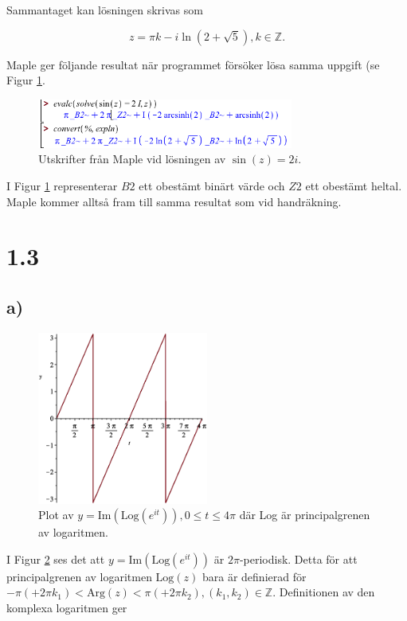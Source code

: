 \documentclass[a4paper]{article}
\begin{document}
Sammantaget kan lösningen skrivas som

\begin{equation*}
	z = \pi k - i\ln(2+\sqrt{5}), k \in \mathbb{Z}.
\end{equation*}

Maple ger följande resultat när programmet försöker lösa samma uppgift (se Figur \ref{fig:maple2}.

\begin{figure}[h!]
	\centering
	\includegraphics[width=0.75\textwidth]{maple2.png}
	\caption{Utskrifter från Maple vid lösningen av $\sin(z) = 2i$.}
	\label{fig:maple2}
\end{figure}

I Figur \ref{fig:maple2} representerar $B2$ ett obestämt binärt värde och $Z2$ ett obestämt heltal. Maple kommer alltså fram till samma resultat som vid handräkning.

\newpage
\section*{1.3}
\subsection*{a)}

\begin{figure}[h!]
	\centering
	\includegraphics[width=0.5\textwidth]{plot1_2.eps}
	\caption{Plot av $y = \text{Im}(\text{Log}(e^{it})), 0 \leq t \leq 4\pi$ där Log är principalgrenen av logaritmen.}
	\label{fig:1_2}
\end{figure}

I Figur \ref{fig:1_2} ses det att $y = \text{Im}(\text{Log}(e^{it}))$ är $2\pi$-periodisk. Detta för att principalgrenen av logaritmen $\text{Log}(z)$ bara är definierad för $-\pi (+2\pi k_1)< \text{Arg}(z) < \pi (+2\pi k_2), (k_1,k_2) \in \mathbb{Z}$. Definitionen av den komplexa logaritmen ger
\end{document}
